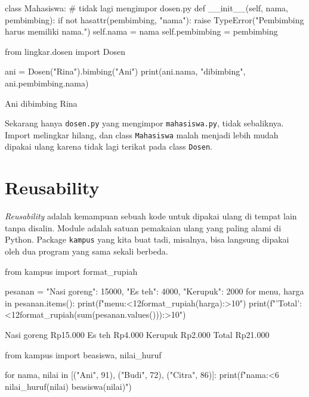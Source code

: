\begin{kode}
class Mahasiswa:                       # tidak lagi mengimpor dosen.py
    def __init__(self, nama, pembimbing):
        if not hasattr(pembimbing, "nama"):
            raise TypeError("Pembimbing harus memiliki nama.")
        self.nama = nama
        self.pembimbing = pembimbing
\end{kode}

\begin{kode}[main.py]
from lingkar.dosen import Dosen

ani = Dosen("Rina").bimbing("Ani")
print(ani.nama, "dibimbing", ani.pembimbing.nama)
\end{kode}

\begin{keluaran}
Ani dibimbing Rina
\end{keluaran}

Sekarang hanya \texttt{dosen.py} yang mengimpor \texttt{mahasiswa.py}, tidak sebaliknya. Import melingkar hilang, dan class \texttt{Mahasiswa} malah menjadi lebih mudah dipakai ulang karena tidak lagi terikat pada class \texttt{Dosen}.

\section{Reusability}

\emph{Reusability} adalah kemampuan sebuah kode untuk dipakai ulang di tempat lain tanpa disalin. Module adalah satuan pemakaian ulang yang paling alami di Python. Package \texttt{kampus} yang kita buat tadi, misalnya, bisa langsung dipakai oleh dua program yang sama sekali berbeda.

\begin{kode}[kantin.py]
from kampus import format_rupiah

pesanan = {"Nasi goreng": 15000, "Es teh": 4000, "Kerupuk": 2000}
for menu, harga in pesanan.items():
    print(f"{menu:<12}{format_rupiah(harga):>10}")
print(f"{'Total':<12}{format_rupiah(sum(pesanan.values())):>10}")
\end{kode}

\begin{keluaran}
Nasi goreng   Rp15.000
Es teh         Rp4.000
Kerupuk        Rp2.000
Total         Rp21.000
\end{keluaran}

\begin{kode}
from kampus import beasiswa, nilai_huruf

for nama, nilai in [("Ani", 91), ("Budi", 72), ("Citra", 86)]:
    print(f"{nama:<6} {nilai_huruf(nilai)}  {beasiswa(nilai)}")
\end{kode}

